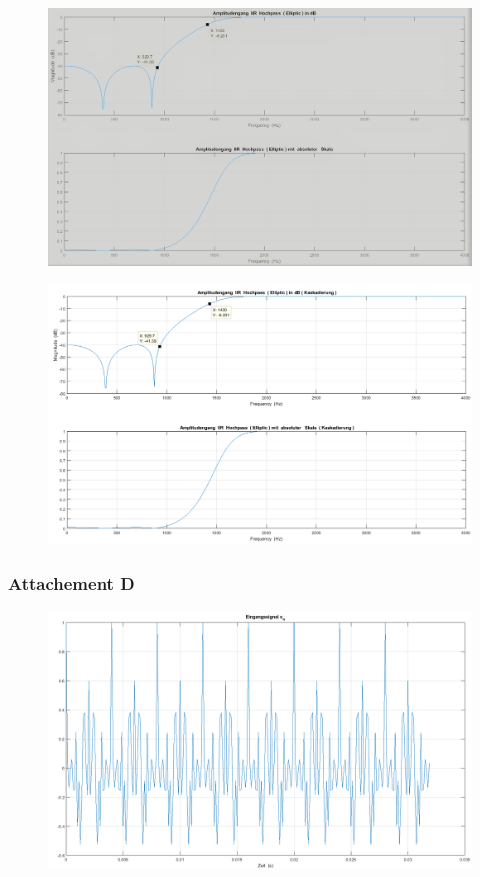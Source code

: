 \begin{figure}
\centering
\includegraphics[width=0.7\linewidth]{Bilder/Attachment_B_ELLIP}
\caption{}
\label{fig:Attachment_B_ELLIP}
\end{figure}

\begin{figure}
\centering
\includegraphics[width=0.7\linewidth]{Bilder/Attachment_B_ELLIP_KASKADE}
\caption{}
\label{fig:Attachment_B_ELLIP_KASKADE}
\end{figure}





\subsubsection{Attachement D}

\begin{figure}
\centering
\includegraphics[width=0.7\linewidth]{Bilder/Attachment_D_Eingangszeitsignal}
\caption{}
\label{fig:Attachment_D_Eingangszeitsignal}
\end{figure}

